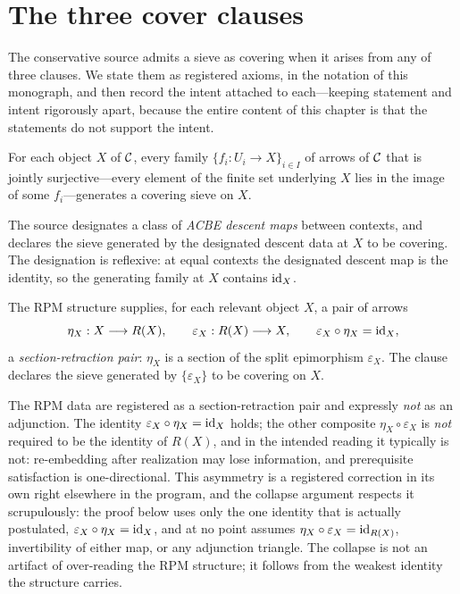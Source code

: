 \section{The three cover clauses}\label{ch05:sec:clauses}

The conservative source admits a sieve as covering when it arises from any of
three clauses. We state them as registered axioms, in the notation of this
monograph, and then record the intent attached to each---keeping statement
and intent rigorously apart, because the entire content of this chapter is
that the statements do not support the intent.

\begin{axiom}\label{ch05:ax:O}
For each object $X$ of $\mathcal{C}$, every family $\{f_i:U_i\to X\}_{i\in I}$ of
arrows of $\mathcal{C}$ that is jointly surjective---every element of the finite set
underlying $X$ lies in the image of some $f_i$---generates a covering sieve
on $X$.
\end{axiom}

\begin{axiom}\label{ch05:ax:A}
The source designates a class of \emph{ACBE descent maps} between contexts,
and declares the sieve generated by the designated descent data at $X$ to be
covering. The designation is reflexive: at equal contexts the designated
descent map is the identity, so the generating family at $X$ contains
$\mathrm{id}_X$.
\end{axiom}

\begin{axiom}\label{ch05:ax:R}
The RPM structure supplies, for each relevant object $X$, a pair of arrows
\[
\eta_X : X \longrightarrow R(X),
\qquad
\varepsilon_X : R(X) \longrightarrow X,
\qquad
\varepsilon_X\circ\eta_X=\mathrm{id}_X ,
\]
a \emph{section-retraction pair}: $\eta_X$ is a section of the split
epimorphism $\varepsilon_X$. The clause declares the sieve generated by
$\{\varepsilon_X\}$ to be covering on $X$.
\end{axiom}

\begin{remark}\label{ch05:rem:notadjunction}
The RPM data are registered as a section-retraction pair and expressly
\emph{not} as an adjunction. The identity $\varepsilon_X\circ\eta_X=\mathrm{id}_X$
holds; the other composite $\eta_X\circ\varepsilon_X$ is \emph{not} required
to be the identity of $R(X)$, and in the intended reading it typically is
not: re-embedding after realization may lose information, and prerequisite
satisfaction is one-directional. This asymmetry is a registered correction in
its own right elsewhere in the program, and the collapse argument respects
it scrupulously: the proof below uses only the one identity that is actually
postulated, $\varepsilon_X\circ\eta_X=\mathrm{id}_X$, and at no point assumes
$\eta_X\circ\varepsilon_X=\mathrm{id}_{R(X)}$, invertibility of either map, or any
adjunction triangle. The collapse is not an artifact of over-reading the RPM
structure; it follows from the weakest identity the structure carries.
\end{remark}

